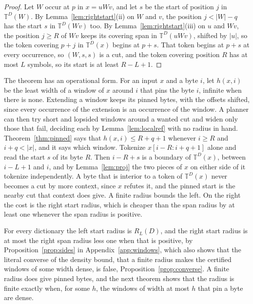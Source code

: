 \documentclass[11pt,a4paper]{article}
\theoremstyle{definition}
\theoremstyle{plain}
\newcommand{\T}{\mathbb{T}}
\newcommand{\ripple}{R_{L}}
\begin{document}
\begin{proof}
Let \(W\) occur at \(p\) in \(x = uWv\), and let \(s\) be the start of position \(j\) in \(\T^D(W)\). By
Lemma~\ref{lem:rightstart}(ii) on \(W\) and \(v\), the position \(j < |W| - q\) has the start \(s\) in \(\T^D(Wv)\) too.
By Lemma~\ref{lem:rightstart}(iii) on \(u\) and \(Wv\), the position \(j \ge R\) of \(Wv\) keeps its covering span in
\(\T^D(uWv)\), shifted by \(|u|\), so the token covering \(p + j\) in \(\T^D(x)\) begins at \(p + s\). That token begins
at \(p + s\) at every occurrence, so \((W, s, s)\) is a cut, and the token covering position \(R\) has at most \(L\)
symbols, so its start is at least \(R - L + 1\).
\end{proof}

The theorem has an operational form. For an input \(x\) and a byte \(i\), let \(h(x, i)\) be the least width of a window
of \(x\) around \(i\) that pins the byte \(i\), infinite when there is none. Extending a window keeps its pinned bytes,
with the offsets shifted, since every occurrence of the extension is an occurrence of the window. A planner can then try
short and lopsided windows around a wanted cut and widen only those that fail, deciding each by Lemma~\ref{lem:localref}
with no radius in hand. Theorem~\ref{thm:pinned} says that \(h(x, i) \le R + q + 1\) whenever \(i \ge R\) and
\(i + q < |x|\), and it says which window. Tokenize \(x[i - R{:}i + q + 1]\) alone and read the start \(s\) of its byte
\(R\). Then \(i - R + s\) is a boundary of \(\T^D(x)\), between \(i - L + 1\) and \(i\), and by Lemma~\ref{lem:proj} the
two pieces of \(x\) on either side of it tokenize independently. A byte that is interior to a token of \(\T^D(x)\) never
becomes a cut by more context, since \(x\) refutes it, and the pinned start is the nearby cut that context does give. A
finite radius bounds the left. On the right the cost is the right start radius, which is cheaper than the span radius by
at least one whenever the span radius is positive.

For every dictionary the left start radius is \(\ripple(D)\), and the right start radius is at most the right span
radius less one when that is positive, by Proposition~\ref{prop:sides} in Appendix~\ref{app:windows}, which also shows
that the literal converse of the density bound, that a finite radius makes the certified windows of some width dense, is
false, Proposition~\ref{prop:converse}. A finite radius does give pinned bytes, and the next theorem shows that the
radius is finite exactly when, for some \(h\), the windows of width at most \(h\) that pin a byte are dense.
\end{document}
